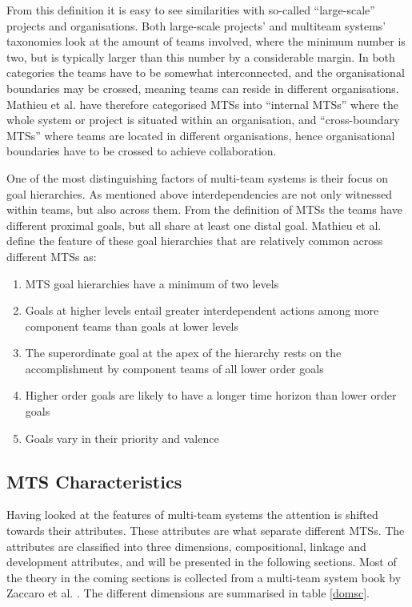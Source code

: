 From this definition it is easy to see similarities with so-called ``large-scale'' projects and organisations. Both large-scale projects' and multiteam systems' taxonomies look at the amount of teams involved, where the minimum number is two, but is typically larger than this number by a considerable margin. In both categories the teams have to be somewhat interconnected, and the organisational boundaries may be crossed, meaning teams can reside in different organisations. Mathieu et al. \cite{Mathieu2001} have therefore categorised MTSs into ``internal MTSs'' where the whole system or project is situated within an organisation, and ``cross-boundary MTSs'' where teams are located in different organisations, hence organisational boundaries have to be crossed to achieve collaboration.

One of the most distinguishing factors of multi-team systems is their focus on goal hierarchies. As mentioned above interdependencies are not only witnessed within teams, but also across them. From the definition of MTSs the teams have different proximal goals, but all share at least one distal goal. Mathieu et al. \cite{Mathieu2001} define the feature of these goal hierarchies that are relatively common across different MTSs as:

\begin{enumerate}
  \item MTS goal hierarchies have a minimum of two levels
  \item Goals at higher levels entail greater interdependent actions among more component teams than goals at lower levels
  \item The superordinate goal at the apex of the hierarchy rests on the accomplishment by component teams of all lower order goals
  \item Higher order goals are likely to have a longer time horizon than lower order goals
  \item Goals vary in their priority and valence
\end{enumerate}

\subsection{MTS Characteristics}

Having looked at the features of multi-team systems the attention is shifted towards their attributes. These attributes are what separate different MTSs. The attributes are classified into three dimensions, compositional, linkage and development attributes, and will be presented in the following sections. Most of the theory in the coming sections is collected from a multi-team system book by Zaccaro et al. \cite{zaccaro2012multiteam}. The different dimensions are summarised in table \ref{domsc}.

